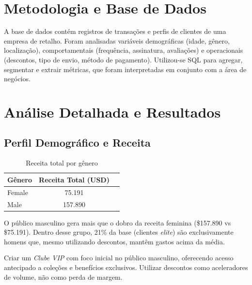 \documentclass[12pt,a4paper]{article}
\begin{document}
\newpage

\section{Metodologia e Base de Dados}
A base de dados contém registros de transações e perfis de clientes de uma empresa de retalho. Foram analisadas variáveis demográficas (idade, gênero, localização), comportamentais (frequência, assinatura, avaliações) e operacionais (descontos, tipo de envio, método de pagamento). Utilizou-se SQL para agregar, segmentar e extrair métricas, que foram interpretadas em conjunto com a área de negócios.

\section{Análise Detalhada e Resultados}

\subsection{Perfil Demográfico e Receita}
\begin{table}[H]
\centering
\caption{Receita total por gênero}
\label{tab:receita_genero}
\begin{tabular}{lcc}
\toprule
\rowcolor{lightgray} \textbf{Gênero} & \textbf{Receita Total (USD)} \\
\midrule
Female & 75.191 \\
Male   & 157.890 \\
\bottomrule
\end{tabular}
\end{table}

\begin{insightbox}
O público masculino gera mais que o dobro da receita feminina (\$157.890 vs \$75.191). Dentro desse grupo, 21\% da base (clientes \textit{elite}) são exclusivamente homens que, mesmo utilizando descontos, mantêm gastos acima da média.
\end{insightbox}
\begin{actionbox}
Criar um \textit{Clube VIP} com foco inicial no público masculino, oferecendo acesso antecipado a coleções e benefícios exclusivos. Utilizar descontos como aceleradores de volume, não como perda de margem.
\end{actionbox}
\end{document}
